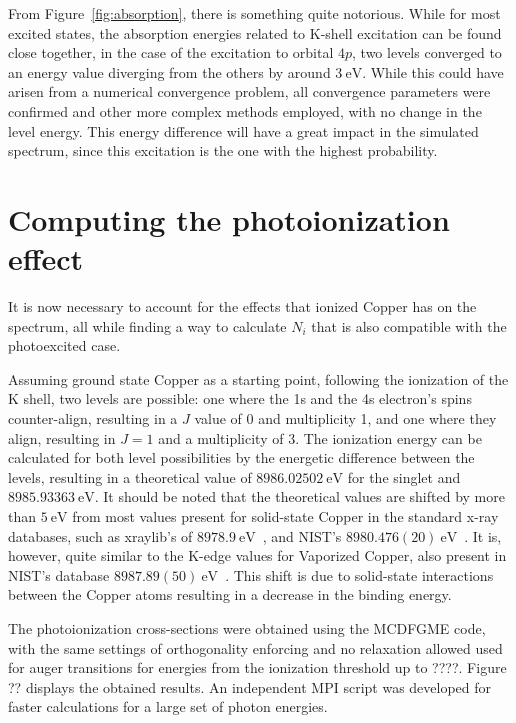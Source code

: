From Figure~\ref{fig:absorption}, there is something quite notorious. While for most excited states, the absorption energies related to K-shell excitation can be found close together, in the case of the excitation to orbital $4p$, two levels converged to an energy value diverging from the others by around $3\ \si{\electronvolt}$. While this could have arisen from a numerical convergence problem, all convergence parameters were confirmed and other more complex methods employed, with no change in the level energy. This energy difference will have a great impact in the simulated spectrum, since this excitation is the one with the highest probability.




\section{Computing the photoionization effect}

It is now necessary to account for the effects that ionized Copper has on the spectrum, all while finding a way to calculate $N_i$ that is also compatible with the photoexcited case.


Assuming ground state Copper as a starting point, following the ionization of the K shell, two levels are possible: one where the 1s and the 4s electron's spins counter-align, resulting in a $J$ value of 0 and multiplicity 1, and one where they align, resulting in $J=1$ and a multiplicity of 3. The ionization energy can be calculated for both level possibilities by the energetic difference between the levels, resulting in a theoretical value of $8986.02502\ \si{\electronvolt}$ for the singlet and $8985.93363\ \si{\electronvolt}$. It should be noted that the theoretical values are shifted by more than $5\ \si{\electronvolt}$ from most values present for solid-state Copper in the standard x-ray databases, such as xraylib's of $8978.9\ \si{\electronvolt}$~\cite{SCHOONJANS2011776}, and NIST's $ 8 980.476(20) \ \si{\electronvolt}$~\cite{NIST_database}. It is, however, quite similar to the K-edge values for Vaporized Copper, also present in NIST's database $8 987.89(50)\ \si{\electronvolt}$~\cite{NIST_database}. This shift is due to solid-state interactions between the Copper atoms resulting in a decrease in the binding energy.


The photoionization cross-sections were obtained using the \gls{MCDFGME} code,  with the same settings of orthogonality enforcing and no relaxation allowed used for auger transitions for energies from the ionization threshold up to ????. Figure ?? displays the obtained results. An independent \gls{MPI} script was developed for faster calculations for a large set of photon energies.

